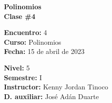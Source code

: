 \begin{center} \textbf
{
    \Large Polinomios \\ \vspace{2mm}Clase \#4
}
\end{center}

\begin{multicols}{2}
{
    \textbf{Encuentro:} 4\\
    \textbf{Curso:} Polinomios\\
    \textbf{Fecha:} 15 de abril de 2023\\
    \begin{flushright}
        \textbf{Nivel:} 5\\
        \textbf{Semestre:} I\\
        \textbf{Instructor:} Kenny Jordan Tinoco\\
        \textbf{D. auxiliar: }José Adán Duarte
    \end{flushright}
}
\end{multicols}

\thispagestyle{first-page-style}